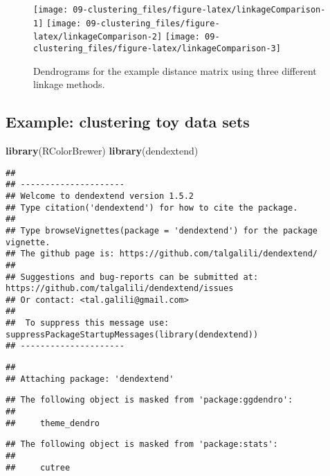 \documentclass[]{book}
\newenvironment{Shaded}{\begin{snugshade}}{\end{snugshade}}
\newcommand{\KeywordTok}[1]{\textcolor[rgb]{0.13,0.29,0.53}{\textbf{{#1}}}}
\newcommand{\NormalTok}[1]{{#1}}
\theoremstyle{definition}
\theoremstyle{definition}
\theoremstyle{definition}
\theoremstyle{remark}
\begin{document}
\begin{figure}

{\centering \texttt{[image: 09-clustering\_files/figure-latex/linkageComparison-1]} \texttt{[image: 09-clustering\_files/figure-latex/linkageComparison-2]} \texttt{[image: 09-clustering\_files/figure-latex/linkageComparison-3]} 

}

\caption{Dendrograms for the example distance matrix using three different linkage methods. }\label{fig:linkageComparison}
\end{figure}

\subsection{Example: clustering toy data
sets}\label{example-clustering-toy-data-sets}

\begin{Shaded}
\begin{Highlighting}[]
\KeywordTok{library}\NormalTok{(RColorBrewer)}
\KeywordTok{library}\NormalTok{(dendextend)}
\end{Highlighting}
\end{Shaded}

\begin{verbatim}
## 
## ---------------------
## Welcome to dendextend version 1.5.2
## Type citation('dendextend') for how to cite the package.
## 
## Type browseVignettes(package = 'dendextend') for the package vignette.
## The github page is: https://github.com/talgalili/dendextend/
## 
## Suggestions and bug-reports can be submitted at: https://github.com/talgalili/dendextend/issues
## Or contact: <tal.galili@gmail.com>
## 
##  To suppress this message use:  suppressPackageStartupMessages(library(dendextend))
## ---------------------
\end{verbatim}

\begin{verbatim}
## 
## Attaching package: 'dendextend'
\end{verbatim}

\begin{verbatim}
## The following object is masked from 'package:ggdendro':
## 
##     theme_dendro
\end{verbatim}

\begin{verbatim}
## The following object is masked from 'package:stats':
## 
##     cutree
\end{verbatim}
\end{document}
